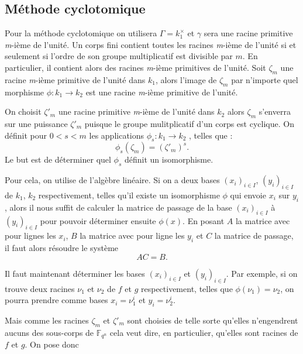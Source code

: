 \documentclass[a4paper]{article} %
\numberwithin{section}{part}
\numberwithin{equation}{section}
\newcommand\nroot[1]{\textit{#1}-ième}
\newcommand\GF[1]{\mathbb{F}_{#1}}
\begin{document}
\subsection{Méthode cyclotomique}

Pour la méthode cyclotomique on utilisera $\Gamma = k_1^{\times}$ et $\gamma$ 
sera une racine primitive \nroot{m} de l'unité.
Un corps fini contient toutes les racines \nroot{m} de l'unité si et seulement 
si l'ordre de son groupe multiplicatif est divisible par $m$. En particulier, il
contient alors des racines \nroot{m} primitives de l'unité. Soit $\zeta_m$ une
racine \nroot{m} primitive de l'unité dans $k_1$, alors l'image de $\zeta_m$ par
n'importe quel morphisme $\phi : k_1 \to k_2$ est une racine \nroot{m} primitive
de l'unité.\par
On choisit $\zeta'_m$ une racine primitive \nroot{m} de l'unité dans $k_2$
alors $\zeta_m$ s'enverra sur une puissance $\zeta'_m$ puisque le groupe 
mulitplicatif d'un corps est cyclique. On définit pour $0 < s < m$ les
applications $\phi_s : k_1 \to k_2$ , telles que :
\begin{equation}
\phi_s(\zeta_m) = (\zeta'_m)^s.
\end{equation}
Le but est de déterminer quel $\phi_s$ définit un isomorphisme.\par
Pour cela, on utilise de l'algèbre linéaire. Si on a deux bases 
$(x_i)_{i\in I}$, $(y_i)_{i\in I}$ de $k_1$, $k_2$ respectivement, telles 
qu'il existe un isomorphisme $\phi$ qui envoie $x_i$ sur $y_i$, alors il nous
suffit de calculer la matrice de passage de la base $(x_i)_{i\in I}$ à
$(y_i)_{i\in I}$ pour pouvoir déterminer ensuite $\phi(x)$. En posant $A$ la
matrice avec pour lignes les $x_i$, $B$ la matrice avec pour ligne les $y_i$ et
$C$ la matrice de passage, il faut alors résoudre le système 
\begin{equation}
AC = B.
\end{equation}
\par
Il faut maintenant déterminer les bases $(x_i)_{i\in I}$ et $(y_i)_{i\in I}$. 
Par exemple, si on trouve deux racines $\nu_1$ et $\nu_2$ de $f$ et $g$ 
respectivement, telles que $\phi(\nu_1) = \nu_2$, on pourra prendre comme bases 
$x_i = \nu_1^i$ et $y_i = \nu_2^i$.\par
Mais comme les racines $\zeta_m$ et $\zeta'_m$ sont choisies de telle sorte 
qu'elles n'engendrent aucuns des sous-corps de $\GF{q^n}$ cela veut 
dire, en particulier, qu'elles sont racines de $f$ et $g$. On pose donc 
\end{document}
